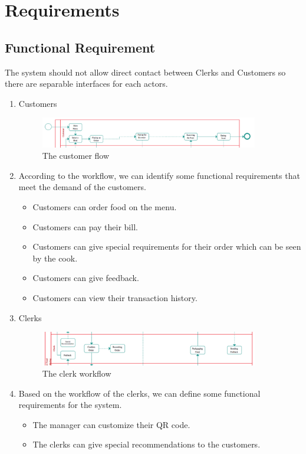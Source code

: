 \documentclass[a4paper]{article}
\numberwithin{equation}{section}
\begin{document}
\section{Requirements}
\subsection{Functional Requirement}
The system should not allow direct contact between Clerks and Customers so there are separable interfaces for each actors.
\begin{enumerate}
  \item{Customers}
        \begin{figure}[H]
          \centering
          \includegraphics[width=0.9\textwidth]{Customer_flow.png}
          \caption{The customer flow}
        \end{figure}
  \item[]According to the workflow, we can identify some functional requirements that meet the demand of the customers.
        \begin{itemize}
          \item Customers can order food on the menu.
          \item Customers can pay their bill.
          \item Customers can give special requirements for their order which can be seen by the cook.
          \item Customers can give feedback.
          \item Customers can view their transaction history.
        \end{itemize}
  \item{Clerks}
        \begin{figure}[H]
          \centering
          \includegraphics[width=0.9\textwidth]{Clerk_workflow.png}
          \caption{The clerk workflow}
        \end{figure}
  \item[]Based on the workflow of the clerks, we can define some functional requirements for the system.
        \begin{itemize}
          \item The manager can customize their QR code.
          \item The clerks can give special recommendations to the customers.
        \end{itemize}
\end{enumerate}
\end{document}
